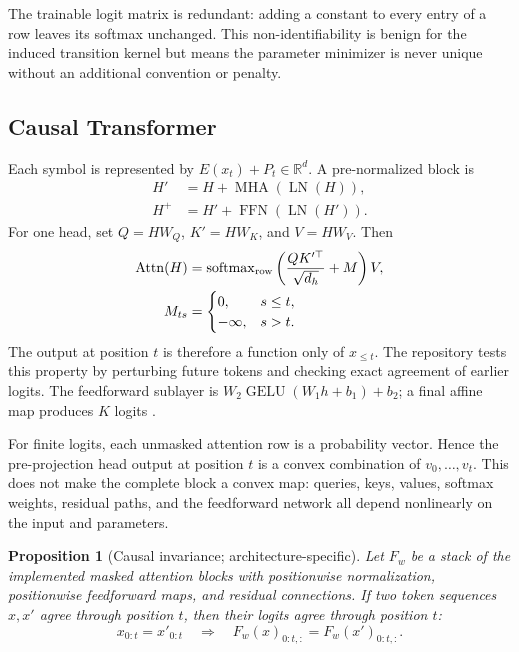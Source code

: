 \documentclass[11pt]{article}
\newtheorem{proposition}[definition]{Proposition}
\newcommand{\R}{\mathbb R}
\newcommand{\1}{\mathbf 1}
\newcommand{\softmax}{\operatorname{softmax}}
\begin{document}
The trainable logit matrix is redundant: adding a constant to every entry of a
row leaves its softmax unchanged. This non-identifiability is benign for the
induced transition kernel but means the parameter minimizer is never unique
without an additional convention or penalty.

\subsection{Causal Transformer}

Each symbol is represented by $E(x_t)+P_t\in\R^d$. A pre-normalized block is
\begin{align*}
 H'&=H+\operatorname{MHA}(\operatorname{LN}(H)),\\
 H^+&=H'+\operatorname{FFN}(\operatorname{LN}(H')).
\end{align*}
For one head, set $Q=HW_Q$, $K'=HW_K$, and $V=HW_V$. Then
\begin{align}
 \operatorname{Attn}(H)&=\softmax_{\rm row}
 \left(\frac{QK'^{\top}}{\sqrt{d_h}}+M\right)V,\\
 M_{ts}&=\begin{cases}0,&s\le t,\\-\infty,&s>t.\end{cases}
\end{align}
The output at position $t$ is therefore a function only of $x_{\le t}$. The
repository tests this property by perturbing future tokens and checking exact
agreement of earlier logits. The feedforward sublayer is
$W_2\operatorname{GELU}(W_1h+b_1)+b_2$; a final affine map produces $K$
logits \cite{vaswani-2017-attention}.

For finite logits, each unmasked attention row is a probability vector. Hence
the pre-projection head output at position $t$ is a convex combination of
$v_0,\ldots,v_t$. This does not make the complete block a convex map: queries,
keys, values, softmax weights, residual paths, and the feedforward network all
depend nonlinearly on the input and parameters.

\begin{proposition}[Causal invariance; architecture-specific]
Let $F_w$ be a stack of the implemented masked attention blocks with
positionwise normalization, positionwise feedforward maps, and residual
connections. If two token sequences $x,x'$ agree through position $t$, then
their logits agree through position $t$:
\[
 x_{0:t}=x'_{0:t}
 \quad\Longrightarrow\quad
 F_w(x)_{0:t,:}=F_w(x')_{0:t,:}.
\]
\end{proposition}
\end{document}
